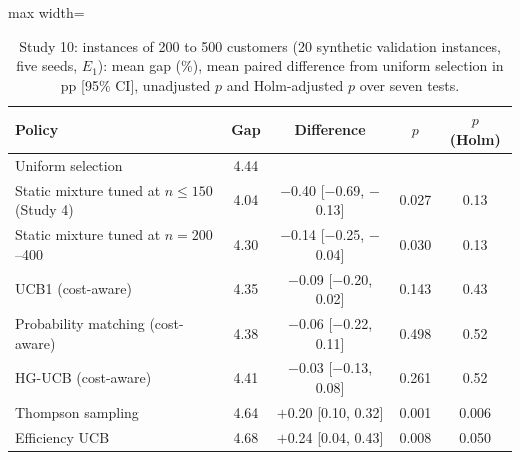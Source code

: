 \begin{table}[t]
\caption{Study 10: instances of 200 to 500 customers (20 synthetic validation instances, five seeds, $E_1$): mean gap (\%), mean paired difference from uniform selection in pp [95\% CI], unadjusted $p$ and Holm-adjusted $p$ over seven tests.}\label{tab:s10}
\centering
\small
\begin{adjustbox}{max width=\linewidth}
\begin{tabular}{lcccc}
\toprule
Policy & Gap & Difference & $p$ & $p$ (Holm) \\
\midrule
Uniform selection & 4.44 & & &  \\
Static mixture tuned at $n\le150$ (Study 4) & 4.04 & $-$0.40 [$-$0.69, $-$0.13] & 0.027 & 0.13 \\
Static mixture tuned at $n=200$--400 & 4.30 & $-$0.14 [$-$0.25, $-$0.04] & 0.030 & 0.13 \\
UCB1 (cost-aware) & 4.35 & $-$0.09 [$-$0.20, 0.02] & 0.143 & 0.43 \\
Probability matching (cost-aware) & 4.38 & $-$0.06 [$-$0.22, 0.11] & 0.498 & 0.52 \\
HG-UCB (cost-aware) & 4.41 & $-$0.03 [$-$0.13, 0.08] & 0.261 & 0.52 \\
Thompson sampling & 4.64 & $+$0.20 [0.10, 0.32] & 0.001 & 0.006 \\
Efficiency UCB & 4.68 & $+$0.24 [0.04, 0.43] & 0.008 & 0.050 \\
\bottomrule
\end{tabular}
\end{adjustbox}
\end{table}
